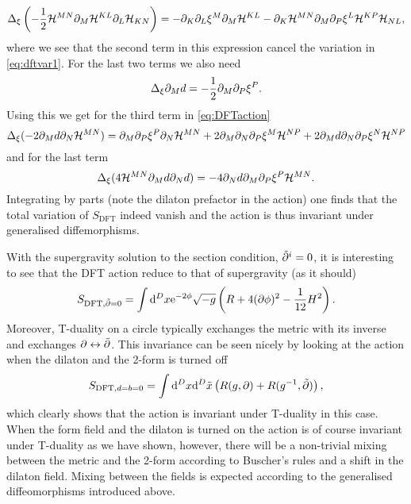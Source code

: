 \begin{equation}
    \Delta_\xi \left(-\frac{1}{2}\mathcal{H}^{MN}\partial_M\mathcal{H}^{KL}\partial_L\mathcal{H}_{KN}\right) = -\partial_K\partial_L\xi^M\partial_M\mathcal{H}^{KL}-\partial_K\mathcal{H}^{MN}\partial_M\partial_P\xi^L\mathcal{H}^{KP}\mathcal{H}_{NL},
\end{equation}
where we see that the second term in this expression cancel the variation in \eqref{eq:dftvar1}. For the last two terms we also need
\begin{equation}
    \Delta_\xi \partial_M d = -\frac{1}{2}\partial_M\partial_P\xi^P.
\end{equation}
Using this we get for the third term in \eqref{eq:DFTaction}
\begin{equation}
    \Delta_\xi (-2\partial_Md\partial_N\mathcal{H}^{MN}) = \partial_M\partial_P\xi^P\partial_N\mathcal{H}^{MN}+2\partial_M\partial_N\partial_P\xi^M\mathcal{H}^{NP}+2\partial_M d\partial_N\partial_P\xi^N\mathcal{H}^{NP}
\end{equation}
and for the last term
\begin{equation}
    \Delta_\xi (4\mathcal{H}^{MN}\partial_Md\partial_Nd) = -4\partial_N d\partial_M\partial_P\xi^P\mathcal{H}^{MN}.
\end{equation}
Integrating by parts (note the dilaton prefactor in the action) one finds that the total variation of $S_{\text{DFT}}$ indeed vanish and the action is thus invariant under generalised diffemorphisms. 


With the supergravity solution to the section condition, $\tilde{\partial}^i = 0$, it is interesting to see that the DFT action reduce to that of supergravity (as it should)
\begin{equation}
    S_{\text{DFT},\tilde{\partial}=0} = \int\mathrm{d}^Dx \mathrm{e}^{-2\phi}\sqrt{-g}\left(R+4(\partial\phi)^2-\frac{1}{12}H^2\right).
\end{equation}
Moreover, T-duality on a circle typically exchanges the metric with its inverse and exchanges $\partial\leftrightarrow\tilde{\partial}$. This invariance can be seen nicely by looking at the action when the dilaton and the 2-form is turned off 
\begin{equation}
    S_{\text{DFT},d=b=0} = \int\mathrm{d}^Dx\mathrm{d}^D\tilde{x}\left(R(g,\partial)+R(g^{-1},\tilde{\partial})\right),
\end{equation}
which clearly shows that the action is invariant under T-duality in this case. When the form field and the dilaton is turned on the action is of course invariant under T-duality as we have shown, however, there will be a non-trivial mixing between the metric and the 2-form according to Buscher's rules and a shift in the dilaton field. Mixing between the fields is expected according to the generalised diffeomorphisms introduced above. 



